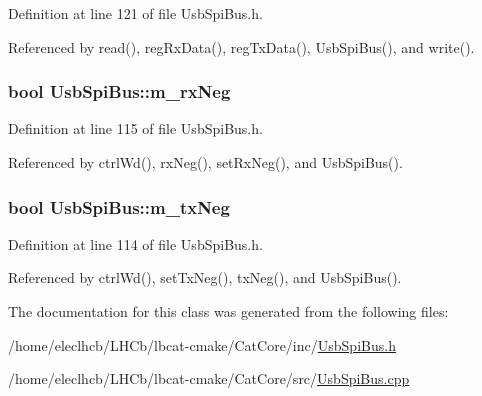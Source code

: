 Definition at line 121 of file UsbSpiBus.h.

Referenced by read(), regRxData(), regTxData(), UsbSpiBus(), and write().\hypertarget{classUsbSpiBus_abf36f2df24c3ec5363efe73c9771bbc8}{
\subsubsection[{m\_\-rxNeg}]{\setlength{\rightskip}{0pt plus 5cm}bool {\bf UsbSpiBus::m\_\-rxNeg}}}
\label{classUsbSpiBus_abf36f2df24c3ec5363efe73c9771bbc8}


Definition at line 115 of file UsbSpiBus.h.

Referenced by ctrlWd(), rxNeg(), setRxNeg(), and UsbSpiBus().\hypertarget{classUsbSpiBus_a48528e7dcb036ecc1732581a89e16d10}{
\subsubsection[{m\_\-txNeg}]{\setlength{\rightskip}{0pt plus 5cm}bool {\bf UsbSpiBus::m\_\-txNeg}}}
\label{classUsbSpiBus_a48528e7dcb036ecc1732581a89e16d10}


Definition at line 114 of file UsbSpiBus.h.

Referenced by ctrlWd(), setTxNeg(), txNeg(), and UsbSpiBus().

The documentation for this class was generated from the following files:\begin{DoxyCompactItemize}
\item 
/home/eleclhcb/LHCb/lbcat-\/cmake/CatCore/inc/\hyperlink{UsbSpiBus_8h}{UsbSpiBus.h}\item 
/home/eleclhcb/LHCb/lbcat-\/cmake/CatCore/src/\hyperlink{UsbSpiBus_8cpp}{UsbSpiBus.cpp}\end{DoxyCompactItemize}
